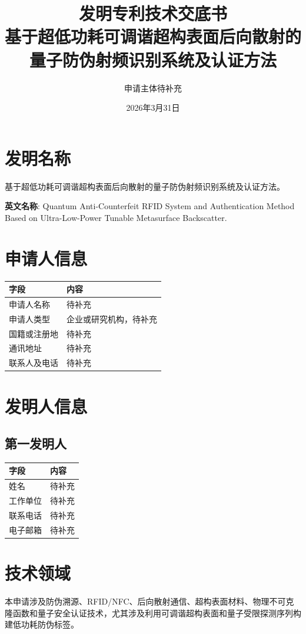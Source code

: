 ﻿\documentclass[12pt,a4paper]{article}
\title{\textbf{发明专利技术交底书}\\[0.5em]\Large 基于超低功耗可调谐超构表面后向散射的量子防伪射频识别系统及认证方法}
\author{申请主体待补充}
\date{2026年3月31日}
\begin{document}
\maketitle
\tableofcontents
\newpage
\section{发明名称}
基于超低功耗可调谐超构表面后向散射的量子防伪射频识别系统及认证方法。

\textbf{英文名称}: Quantum Anti-Counterfeit RFID System and Authentication Method Based on Ultra-Low-Power Tunable Metasurface Backscatter.

\section{申请人信息}
\begin{tabular}{|p{4cm}|p{8cm}|}
\hline
字段 & 内容 \\
\hline
申请人名称 & 待补充 \\
\hline
申请人类型 & 企业或研究机构，待补充 \\
\hline
国籍或注册地 & 待补充 \\
\hline
通讯地址 & 待补充 \\
\hline
联系人及电话 & 待补充 \\
\hline
\end{tabular}

\section{发明人信息}
\subsection{第一发明人}
\begin{tabular}{|p{4cm}|p{8cm}|}
\hline
字段 & 内容 \\
\hline
姓名 & 待补充 \\
\hline
工作单位 & 待补充 \\
\hline
联系电话 & 待补充 \\
\hline
电子邮箱 & 待补充 \\
\hline
\end{tabular}

\section{技术领域}
本申请涉及防伪溯源、RFID/NFC、后向散射通信、超构表面材料、物理不可克隆函数和量子安全认证技术，尤其涉及利用可调谐超构表面和量子受限探测序列构建低功耗防伪标签。
\end{document}

